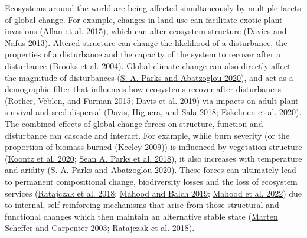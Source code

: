 \documentclass[
  12pt,
]{article}
\begin{document}
Ecosystems around the world are being affected simultaneously by
multiple facets of global change. For example, changes in land use can
facilitate exotic plant invasions
(\protect\hyperlink{ref-Allan2015}{Allan et al. 2015}), which can alter
ecosystem structure (\protect\hyperlink{ref-Davies2013}{Davies and Nafus
2013}). Altered structure can change the likelihood of a disturbance,
the properties of a disturbance and the capacity of the system to
recover after a disturbance (\protect\hyperlink{ref-Brooks2004}{Brooks
et al. 2004}). Global climate change can also directly affect the
magnitude of disturbances (\protect\hyperlink{ref-Parks2020}{S. A. Parks
and Abatzoglou 2020}), and act as a demographic filter that influences
how ecosystems recover after disturbances
(\protect\hyperlink{ref-Rother2015}{Rother, Veblen, and Furman 2015};
\protect\hyperlink{ref-Davis2019}{Davis et al. 2019}) via impacts on
adult plant survival and seed dispersal
(\protect\hyperlink{ref-Davis2018}{Davis, Higuera, and Sala 2018};
\protect\hyperlink{ref-Eskelinen2020}{Eskelinen et al. 2020}). The
combined effects of global change forces on structure, function and
disturbance can cascade and interact. For example, while burn severity
(or the proportion of biomass burned
(\protect\hyperlink{ref-Keeley2009}{Keeley 2009})) is influenced by
vegetation structure (\protect\hyperlink{ref-Koontz2020}{Koontz et al.
2020}; \protect\hyperlink{ref-Parks2018}{Sean A. Parks et al. 2018}), it
also increases with temperature and aridity
(\protect\hyperlink{ref-Parks2020}{S. A. Parks and Abatzoglou 2020}).
These forces can ultimately lead to permanent compositional change,
biodiversity losses and the loss of ecosystem services
(\protect\hyperlink{ref-Ratajczak2018}{Ratajczak et al. 2018};
\protect\hyperlink{ref-Mahood2019}{Mahood and Balch 2019};
\protect\hyperlink{ref-Mahood2021}{Mahood et al. 2022}) due to internal,
self-reinforcing mechanisms that arise from those structural and
functional changes which then maintain an alternative stable state
(\protect\hyperlink{ref-Scheffer2003}{Marten Scheffer and Carpenter
2003}; \protect\hyperlink{ref-Ratajczak2018}{Ratajczak et al. 2018}).
\end{document}
